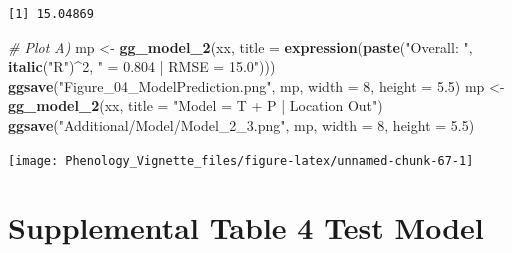 \documentclass[
]{article}
\newenvironment{Shaded}{\begin{snugshade}}{\end{snugshade}}
\newcommand{\CommentTok}[1]{\textcolor[rgb]{0.56,0.35,0.01}{\textit{#1}}}
\newcommand{\DataTypeTok}[1]{\textcolor[rgb]{0.13,0.29,0.53}{#1}}
\newcommand{\DecValTok}[1]{\textcolor[rgb]{0.00,0.00,0.81}{#1}}
\newcommand{\FloatTok}[1]{\textcolor[rgb]{0.00,0.00,0.81}{#1}}
\newcommand{\KeywordTok}[1]{\textcolor[rgb]{0.13,0.29,0.53}{\textbf{#1}}}
\newcommand{\NormalTok}[1]{#1}
\newcommand{\OperatorTok}[1]{\textcolor[rgb]{0.81,0.36,0.00}{\textbf{#1}}}
\newcommand{\StringTok}[1]{\textcolor[rgb]{0.31,0.60,0.02}{#1}}
\begin{document}
\begin{verbatim}
[1] 15.04869
\end{verbatim}

\begin{Shaded}
\begin{Highlighting}[]
\CommentTok{# Plot A)}
\NormalTok{mp <-}\StringTok{ }\KeywordTok{gg_model_2}\NormalTok{(xx, }\DataTypeTok{title =} \KeywordTok{expression}\NormalTok{(}\KeywordTok{paste}\NormalTok{(}\StringTok{"Overall: "}\NormalTok{,}
        \KeywordTok{italic}\NormalTok{(}\StringTok{"R"}\NormalTok{)}\OperatorTok{^}\DecValTok{2}\NormalTok{, }\StringTok{" = 0.804 | RMSE = 15.0"}\NormalTok{)))}
\KeywordTok{ggsave}\NormalTok{(}\StringTok{"Figure_04_ModelPrediction.png"}\NormalTok{, mp, }\DataTypeTok{width =} \DecValTok{8}\NormalTok{, }\DataTypeTok{height =} \FloatTok{5.5}\NormalTok{)}
\NormalTok{mp <-}\StringTok{ }\KeywordTok{gg_model_2}\NormalTok{(xx, }\DataTypeTok{title =} \StringTok{"Model = T + P | Location Out"}\NormalTok{)}
\KeywordTok{ggsave}\NormalTok{(}\StringTok{"Additional/Model/Model_2_3.png"}\NormalTok{, mp, }\DataTypeTok{width =} \DecValTok{8}\NormalTok{, }\DataTypeTok{height =} \FloatTok{5.5}\NormalTok{)}
\end{Highlighting}
\end{Shaded}

\texttt{[image: Phenology\_Vignette\_files/figure-latex/unnamed-chunk-67-1]}

\hypertarget{supplemental-table-4-test-model}{%
\section{Supplemental Table 4 Test
Model}\label{supplemental-table-4-test-model}}
\end{document}
